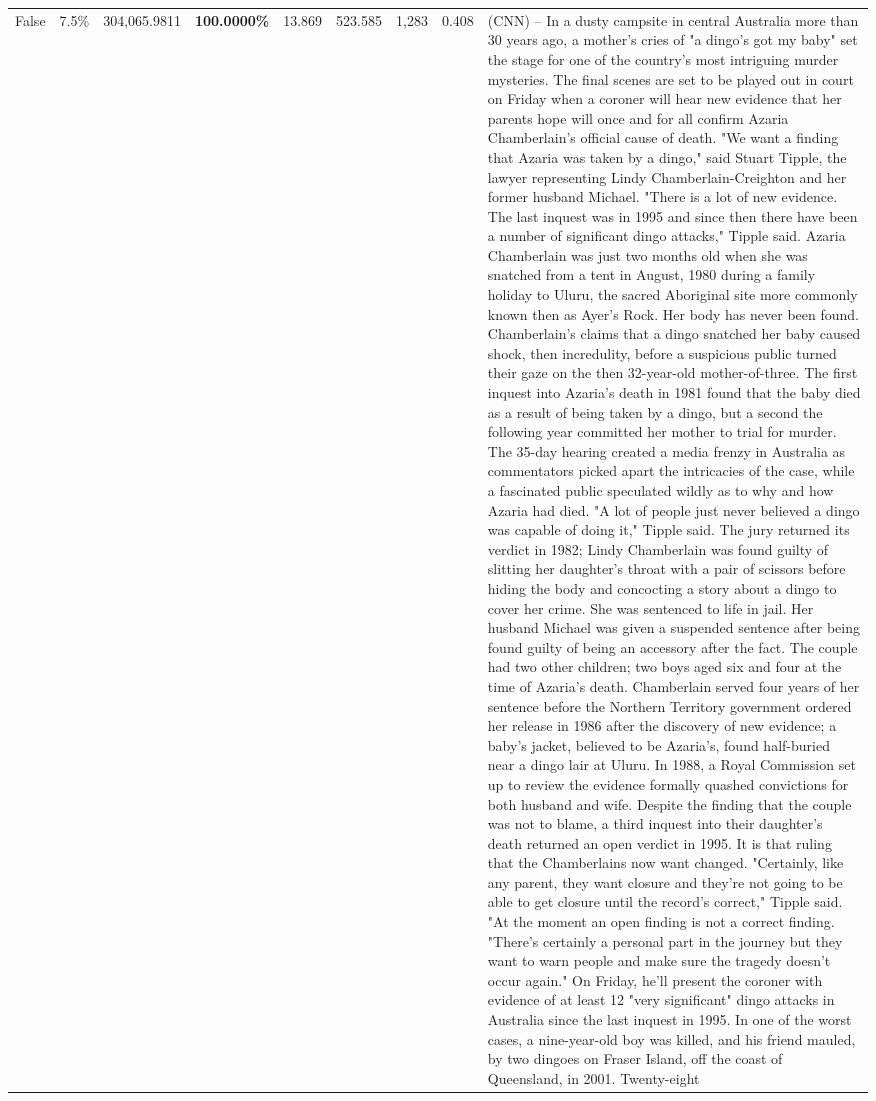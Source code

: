 \begin{table}[H]
\begin{tabular}{lllrlllll}
False & 7.5\% & \color{red} 304,065.9811 & \bfseries \color{red} 100.0000\% & 13.869 & 523.585 & 1,283 & 0.408 & (CNN) -- In a dusty campsite in central Australia more than 30 years ago, a mother's cries of "a dingo's got my baby" set the stage for one of the country's most intriguing murder mysteries. The final scenes are set to be played out in court on Friday when a coroner will hear new evidence that her parents hope will once and for all confirm Azaria Chamberlain's official cause of death. "We want a finding that Azaria was taken by a dingo," said Stuart Tipple, the lawyer representing Lindy Chamberlain-Creighton and her former husband Michael. "There is a lot of new evidence. The last inquest was in 1995 and since then there have been a number of significant dingo attacks," Tipple said. Azaria Chamberlain was just two months old when she was snatched from a tent in August, 1980 during a family holiday to Uluru, the sacred Aboriginal site more commonly known then as Ayer's Rock. Her body has never been found. Chamberlain's claims that a dingo snatched her baby caused shock, then incredulity, before a suspicious public turned their gaze on the then 32-year-old mother-of-three. The first inquest into Azaria's death in 1981 found that the baby died as a result of being taken by a dingo, but a second the following year committed her mother to trial for murder. The 35-day hearing created a media frenzy in Australia as commentators picked apart the intricacies of the case, while a fascinated public speculated wildly as to why and how Azaria had died. "A lot of people just never believed a dingo was capable of doing it," Tipple said. The jury returned its verdict in 1982; Lindy Chamberlain was found guilty of slitting her daughter's throat with a pair of scissors before hiding the body and concocting a story about a dingo to cover her crime. She was sentenced to life in jail. Her husband Michael was given a suspended sentence after being found guilty of being an accessory after the fact. The couple had two other children; two boys aged six and four at the time of Azaria's death. Chamberlain served four years of her sentence before the Northern Territory government ordered her release in 1986 after the discovery of new evidence; a baby's jacket, believed to be Azaria's, found half-buried near a dingo lair at Uluru. In 1988, a Royal Commission set up to review the evidence formally quashed convictions for both husband and wife. Despite the finding that the couple was not to blame, a third inquest into their daughter's death returned an open verdict in 1995. It is that ruling that the Chamberlains now want changed. "Certainly, like any parent, they want closure and they're not going to be able to get closure until the record's correct," Tipple said. "At the moment an open finding is not a correct finding. "There's certainly a personal part in the journey but they want to warn people and make sure the tragedy doesn't occur again." On Friday, he'll present the coroner with evidence of at least 12 "very significant" dingo attacks in Australia since the last inquest in 1995. In one of the worst cases, a nine-year-old boy was killed, and his friend mauled, by two dingoes on Fraser Island, off the coast of Queensland, in 2001. Twenty-eight 
\end{tabular}
\end{table}
